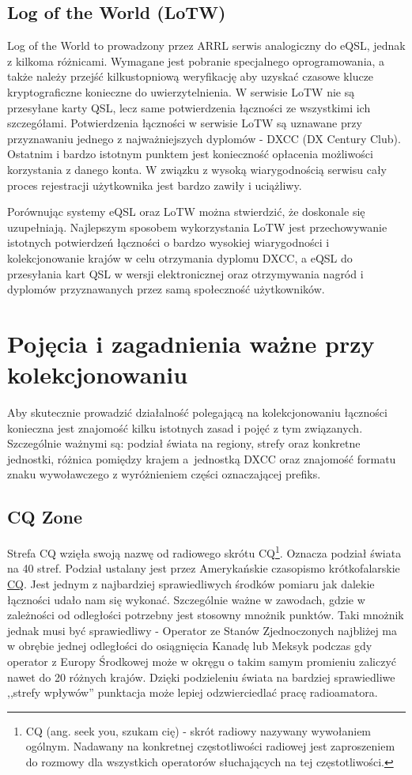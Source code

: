 \documentclass[]{mgr}
\begin{document}
            \subsection{Log of the World (LoTW)}
            Log of the World to prowadzony przez ARRL serwis analogiczny do eQSL, jednak z kilkoma różnicami. Wymagane jest pobranie specjalnego oprogramowania, a także należy przejść kilkustopniową weryfikację aby uzyskać czasowe klucze kryptograficzne konieczne do uwierzytelnienia. W serwisie LoTW nie są przesyłane karty QSL, lecz same potwierdzenia łączności ze wszystkimi ich szczegółami. Potwierdzenia łączności w serwisie LoTW są uznawane przy przyznawaniu jednego z najważniejszych dyplomów - DXCC (DX Century Club). Ostatnim i bardzo istotnym punktem jest konieczność opłacenia możliwości korzystania z danego konta. W związku z wysoką wiarygodnością serwisu cały proces rejestracji użytkownika jest bardzo zawiły i uciążliwy.

            Porównując systemy eQSL oraz LoTW można stwierdzić, że doskonale się uzupełniają. Najlepszym sposobem wykorzystania LoTW jest przechowywanie istotnych potwierdzeń łączności o bardzo wysokiej wiarygodności i kolekcjonowanie krajów w celu otrzymania dyplomu DXCC, a eQSL do przesyłania kart QSL w wersji elektronicznej oraz otrzymywania nagród i dyplomów przyznawanych przez samą społeczność użytkowników.

        \section{Pojęcia i zagadnienia ważne przy kolekcjonowaniu}
        Aby skutecznie prowadzić działalność polegającą na kolekcjonowaniu łączności konieczna jest znajomość kilku istotnych zasad i pojęć z tym związanych. Szczególnie ważnymi są: podział świata na regiony, strefy oraz konkretne jednostki, różnica pomiędzy krajem a~jednostką DXCC oraz znajomość formatu znaku wywoławczego z wyróżnieniem części oznaczającej prefiks.

            \subsection{CQ Zone}
            Strefa CQ wzięła swoją nazwę od radiowego skrótu CQ\footnote{CQ (ang. seek you, szukam cię) - skrót radiowy nazywany wywołaniem ogólnym. Nadawany na konkretnej częstotliwości radiowej jest zaproszeniem do rozmowy dla wszystkich operatorów słuchających na tej częstotliwości.}. Oznacza podział świata na 40 stref. Podział ustalany jest przez Amerykańskie czasopismo krótkofalarskie \underline{CQ}. Jest jednym z najbardziej sprawiedliwych środków pomiaru jak dalekie łączności udało nam się wykonać. Szczególnie ważne w zawodach, gdzie w zależności od odległości potrzebny jest stosowny mnożnik punktów. Taki mnożnik jednak musi być sprawiedliwy - Operator ze Stanów Zjednoczonych najbliżej ma w obrębie jednej odległości do osiągnięcia Kanadę lub Meksyk podczas gdy operator z Europy Środkowej może w okręgu o takim samym promieniu zaliczyć nawet do 20 różnych krajów. Dzięki podzieleniu świata na bardziej sprawiedliwe ,,strefy wpływów'' punktacja może lepiej odzwierciedlać pracę radioamatora.
\end{document}
